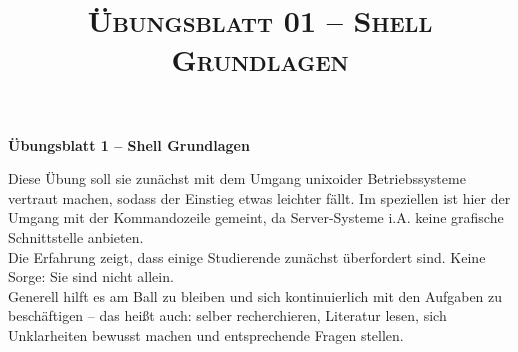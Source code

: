 \documentclass[paper=a4,fontsize=11pt]{scrartcl}%
\title{	
\normalfont \normalsize 
\textsc{Übungsblatt 01 -- Shell Grundlagen}
}
\numberwithin{equation}{section}
\begin{document}
\begin{center}
\Large{\textbf{Übungsblatt 1 -- Shell Grundlagen}}
\end{center}
Diese Übung soll sie zunächst mit dem Umgang unixoider Betriebssysteme vertraut machen, sodass der Einstieg etwas leichter fällt. Im speziellen ist hier der Umgang mit der Kommandozeile gemeint, da Server-Systeme i.A. keine grafische Schnittstelle anbieten.\\
Die Erfahrung zeigt, dass einige Studierende zunächst überfordert sind. Keine Sorge: Sie sind nicht allein.\\
Generell hilft es am Ball zu bleiben und sich kontinuierlich mit den Aufgaben zu beschäftigen -- das heißt auch: selber recherchieren, Literatur lesen, sich Unklarheiten bewusst machen und entsprechende Fragen stellen.
\end{document}
